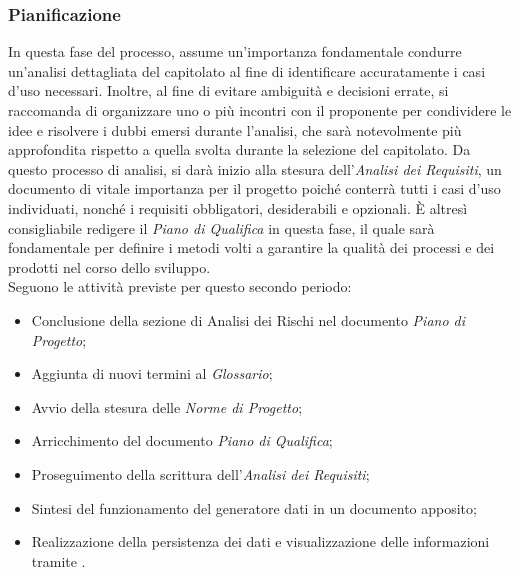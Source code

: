 \subsubsection{Pianificazione}
In questa fase del processo, assume un'importanza fondamentale condurre un'analisi dettagliata del capitolato al fine di identificare accuratamente i casi d'uso necessari. Inoltre, al fine di evitare ambiguità e decisioni errate, si raccomanda di organizzare uno o più incontri con il proponente per condividere le idee e risolvere i dubbi emersi durante l'analisi, che sarà notevolmente più approfondita rispetto a quella svolta durante la selezione del capitolato. Da questo processo di analisi, si darà inizio alla stesura dell'\textit{Analisi dei Requisiti}, un documento di vitale importanza per il progetto poiché conterrà tutti i casi d'uso individuati, nonché i requisiti obbligatori, desiderabili e opzionali.
È altresì consigliabile redigere il \textit{Piano di Qualifica} in questa fase, il quale sarà fondamentale per definire i metodi volti a garantire la qualità dei processi e dei prodotti nel corso dello sviluppo. \\ Seguono le attività previste per questo secondo periodo:
\begin{itemize}
\setlength{\itemsep}{0}
    \item Conclusione della sezione di Analisi dei Rischi nel documento \textit{Piano di Progetto};
    \item Aggiunta di nuovi termini al \textit{Glossario};
    \item Avvio della stesura delle \textit{Norme di Progetto};
    \item Arricchimento del documento \textit{Piano di Qualifica};
    \item Proseguimento della scrittura dell'\textit{Analisi dei Requisiti};
    \item Sintesi del funzionamento del generatore dati in un documento apposito;
    \item Realizzazione della persistenza dei dati e visualizzazione delle informazioni tramite .
\end{itemize}

